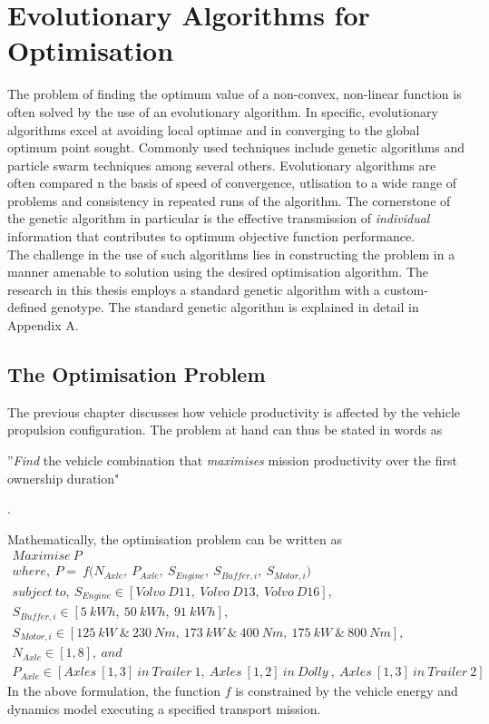 \documentclass[ExampleMasters.tex]{subfiles}
\begin{document}
	\chapter{Evolutionary Algorithms for Optimisation}
	The problem of finding the optimum value of a non-convex, non-linear function is often solved by the use of an evolutionary algorithm. In specific, evolutionary algorithms excel at avoiding local optimae and in converging to the global optimum point sought. Commonly used techniques include genetic algorithms and particle swarm techniques among several others. Evolutionary algorithms are often compared n the basis of speed of convergence, utlisation to a wide range of problems and consistency in repeated runs of the algorithm. The cornerstone of the genetic algorithm in particular is the effective transmission of \textit{individual} information that contributes to optimum objective function performance.\\

	The challenge in the use of such algorithms lies in constructing the problem in a manner amenable to solution using the desired optimisation algorithm. The research in this thesis employs a standard genetic algorithm with a custom-defined genotype. The standard genetic algorithm is explained in detail in Appendix A.\\

	\section{The Optimisation Problem}
		The previous chapter discusses how vehicle productivity is affected by the vehicle propulsion configuration. The problem at hand can thus be stated in words as\\
		
		\centerline{''\textit{Find} the vehicle combination that \textit{maximises} mission productivity over the first ownership duration"}. 

		Mathematically, the optimisation problem can be written as
		\begin{gather}
			\textit{Maximise}\  P\\
			where,\ P =\ f\Bigg(N_{Axle},\ P_{Axle},\ S_{Engine},\ S_{Buffer,i},\ S_{Motor,i}\Bigg)\\
			subject\ to,\ S_{Engine} \in {[Volvo\ D11,\ Volvo\ D13,\ Volvo\ D16]},\\
			S_{Buffer,i} \in {[5\ kWh,\ 50\ kWh,\ 91\ kWh]},\\
			S_{Motor,i} \in {[125\ kW\ \&\ 230\ Nm,\ 173\ kW\ \&\ 400\ Nm,\ 175\ kW\ \&\ 800\ Nm]},\\
			N_{Axle} \in {[1,8]},\ and\\
			P_{Axle} \in {[Axles\ [1,3]\ in\ Trailer\ 1,\ Axles\ [1,2]\ in\ Dolly\ ,\ Axles\ [1,3]\ in\ Trailer\ 2]}
		\end{gather}
		In the above formulation, the function $f$ is constrained by the vehicle energy and dynamics model executing a specified transport mission.\\
\end{document}
